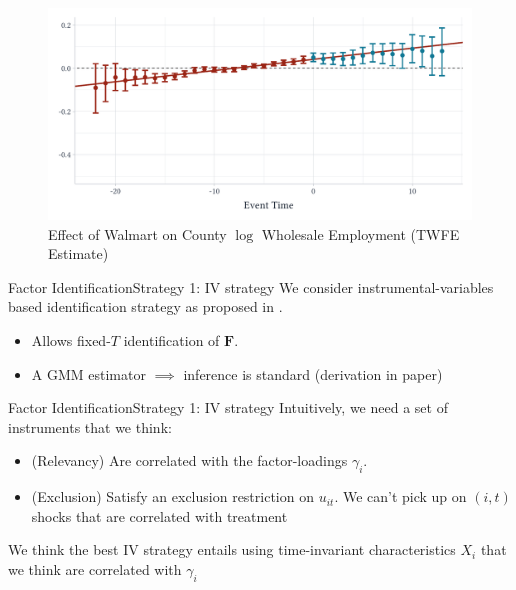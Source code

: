 \documentclass[aspectratio=169,t,11pt]{beamer}
\begin{document}
\begin{frame}
  \begin{figure}
    \caption{Effect of Walmart on County $\log$ Wholesale Employment (TWFE Estimate)}
    \begin{adjustbox}{width=0.85\textwidth}
      \includegraphics{../figures/did2s_wholesale.pdf}
    \end{adjustbox}
  \end{figure}
\end{frame}

\begin{frame}{Factor Identification}{Strategy 1: IV strategy}\label{slide:qld_strategy}
  We consider instrumental-variables based identification strategy as proposed in .
  \begin{itemize}
    \item Allows fixed-$T$ identification of $\bm{F}$.
    \item A GMM estimator $\implies$ inference is standard (derivation in paper)
  \end{itemize}

\end{frame}

\begin{frame}{Factor Identification}{Strategy 1: IV strategy}
  Intuitively, we need a set of instruments that we think:

  \begin{itemize}
    \item {\color{zinc500} (Relevancy)} Are correlated with the factor-loadings $\gamma_i$.

    \item {\color{zinc500} (Exclusion)} Satisfy an exclusion restriction on $u_{it}$. We can't pick up on $(i,t)$ shocks that are correlated with treatment
  \end{itemize}

  \bigskip
  We think the best IV strategy entails using time-invariant characteristics $X_i$ that we think are correlated with $\gamma_i$

\end{frame}
\end{document}
